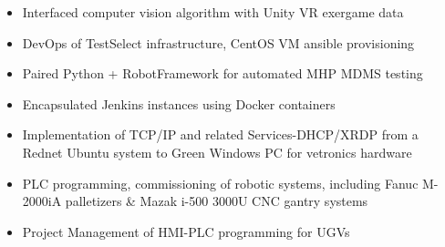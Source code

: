 \documentclass[10pt,a4paper]{altacv}
\begin{document}

%

\begin{fullwidth}
\makecvheader
\end{fullwidth}

%




\begin{itemize}
    \item Interfaced computer vision algorithm with Unity VR exergame data
\end{itemize}

\divider


\begin{itemize}
  \item DevOps of TestSelect infrastructure, CentOS VM ansible provisioning
  \item Paired Python + RobotFramework for automated MHP MDMS testing
  \item Encapsulated Jenkins instances using Docker containers
  \item Implementation of TCP/IP and related Services-DHCP/XRDP from a Rednet Ubuntu system to Green Windows PC for vetronics hardware
\end{itemize}

\divider

%


\begin{itemize}
  \item PLC programming, commissioning of robotic systems, including Fanuc M-2000iA palletizers \& Mazak i-500 3000U CNC  gantry systems
  \item Project Management of HMI-PLC programming for UGVs
\end{itemize}
\end{document}
